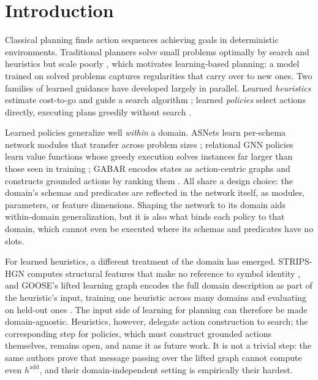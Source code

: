 \documentclass[letterpaper]{article} %
\begin{document}
\section{Introduction}

Classical planning finds action sequences achieving goals in deterministic
environments. Traditional planners solve small problems optimally by search
and heuristics but scale poorly \citep{complexity-planning, fast_downward},
which motivates learning-based planning: a model trained on solved problems
captures regularities that carry over to new ones. Two families of learned
guidance have developed largely in parallel.
Learned \emph{heuristics} estimate cost-to-go and guide a search algorithm
\citep{strips_hgn, karia2021learning, goose_v2}; learned \emph{policies}
select actions directly, executing plans greedily without search
\citep{toyer2020asnets, expressive_v1, gabar}.

Learned policies generalize well \emph{within} a domain. ASNets learn
per-schema network modules that transfer across problem sizes
\citep{toyer2020asnets}; relational GNN policies learn value functions whose
greedy execution solves instances far larger than those seen in training
\citep{expressive_v1, policy_beyond_c2}; GABAR encodes states as
action-centric graphs and constructs grounded actions by ranking them
\citep{gabar}. All share a design choice: the domain's schemas and
predicates are reflected in the network itself, as modules, parameters, or
feature dimensions. Shaping the network to its domain aids within-domain
generalization, but it is also what binds each policy to that domain, which
cannot even be executed where its schemas and predicates have no slots.

For learned heuristics, a different treatment of the domain has emerged.
STRIPS-HGN computes structural features that make no reference to symbol
identity \citep{strips_hgn}, and GOOSE's lifted learning graph encodes the
full domain description as part of the heuristic's input, training one
heuristic across many domains and evaluating on held-out ones
\citep{goose_v2}. The input side of learning for planning can therefore be
made domain-agnostic. Heuristics, however, delegate action construction to
search; the corresponding step for policies, which must construct grounded
actions themselves, remains open, and \citet{goose_v2} name it as future
work. It is not a trivial step: the same authors prove that message passing
over the lifted graph cannot compute even $h^{\mathrm{add}}$, and their
domain-independent setting is empirically their hardest.
\end{document}
